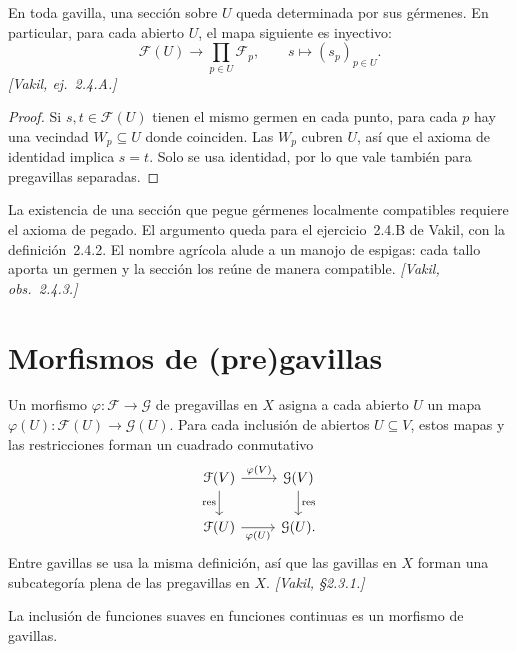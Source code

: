 \begin{teo}
\label{teo:s04-f-gavilla-todo-abierto-u}
En toda gavilla, una sección sobre $U$ queda determinada por sus gérmenes. En particular, para cada abierto $U$, el mapa siguiente es inyectivo:
\[
\mathcal F(U)\longrightarrow\prod_{p\in U}\mathcal F_p,\qquad s\longmapsto(s_p)_{p\in U}.
\]
\emph{[Vakil, ej.~2.4.A.]}
\end{teo}
\begin{proof}
Si $s,t\in\mathcal F(U)$ tienen el mismo germen en cada punto, para cada $p$ hay una vecindad $W_p\subseteq U$ donde coinciden. Las $W_p$ cubren $U$, así que el axioma de identidad implica $s=t$. Solo se usa identidad, por lo que vale también para pregavillas separadas.
\end{proof}

\begin{obs}
\label{obs:s04-reciproco-nombre-gavilla}
La existencia de una sección que pegue gérmenes localmente compatibles requiere el axioma de pegado. El argumento queda para el ejercicio~2.4.B de Vakil, con la definición~2.4.2. El nombre agrícola alude a un manojo de espigas: cada tallo aporta un germen y la sección los reúne de manera compatible. \emph{[Vakil, obs.~2.4.3.]}
\end{obs}

\section{Morfismos de (pre)gavillas}

\begin{defi}
\label{defi:s04-morfismo-pregavillas}
Un morfismo $\varphi\colon\mathcal F\to\mathcal G$ de pregavillas en $X$ asigna a cada abierto $U$ un mapa $\varphi(U)\colon\mathcal F(U)\to\mathcal G(U)$. Para cada inclusión de abiertos $U\subseteq V$, estos mapas y las restricciones forman un cuadrado conmutativo
\[
\begin{tikzcd}
\mathcal F(V) \arrow[r,"\varphi(V)"] \arrow[d,"\res"'] & \mathcal G(V) \arrow[d,"\res"] \\
\mathcal F(U) \arrow[r,"\varphi(U)"'] & \mathcal G(U).
\end{tikzcd}
\]
Entre gavillas se usa la misma definición, así que las gavillas en $X$ forman una subcategoría plena de las pregavillas en $X$. \emph{[Vakil, \S2.3.1.]}
\end{defi}

\begin{ejem}
\label{ejem:s04-inclusion-funciones-suaves-funciones-continuas}
La inclusión de funciones suaves en funciones continuas es un morfismo de gavillas.
\end{ejem}

